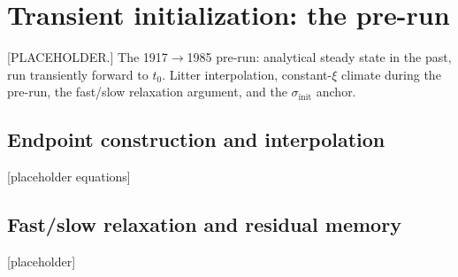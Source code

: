 \documentclass[../HIKET_draft_v1.tex]{subfiles}
\begin{document}
\section{Transient initialization: the pre-run}
\label{app:transient}

[PLACEHOLDER.] The 1917$\to$1985 pre-run: analytical steady state in the past,
run transiently forward to $t_0$. Litter interpolation, constant-$\xi$ climate
during the pre-run, the fast/slow relaxation argument, and the
$\sigma_{\mathrm{init}}$ anchor.

\subsection{Endpoint construction and interpolation}
[placeholder equations]

\subsection{Fast/slow relaxation and residual memory}
[placeholder]
\end{document}
